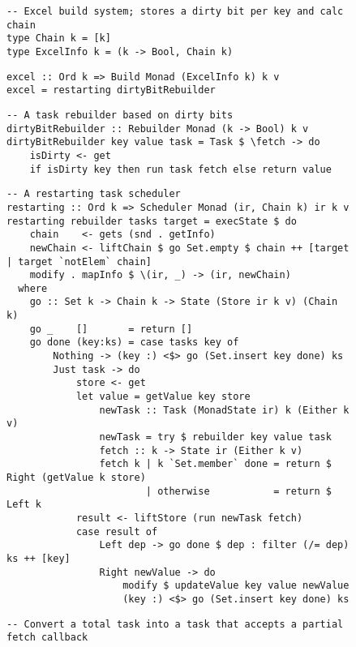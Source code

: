 \begin{figure}
\begin{verbatim}
-- Excel build system; stores a dirty bit per key and calc chain
type Chain k = [k]
type ExcelInfo k = (k -> Bool, Chain k)
\end{verbatim}
\vspace{0mm}
\begin{verbatim}
excel :: Ord k => Build Monad (ExcelInfo k) k v
excel = restarting dirtyBitRebuilder
\end{verbatim}
\vspace{0mm}
\begin{verbatim}
-- A task rebuilder based on dirty bits
dirtyBitRebuilder :: Rebuilder Monad (k -> Bool) k v
dirtyBitRebuilder key value task = Task $ \fetch -> do
    isDirty <- get
    if isDirty key then run task fetch else return value
\end{verbatim}
\vspace{0mm}
\begin{verbatim}
-- A restarting task scheduler
restarting :: Ord k => Scheduler Monad (ir, Chain k) ir k v
restarting rebuilder tasks target = execState $ do
    chain    <- gets (snd . getInfo)
    newChain <- liftChain $ go Set.empty $ chain ++ [target | target `notElem` chain]
    modify . mapInfo $ \(ir, _) -> (ir, newChain)
  where
    go :: Set k -> Chain k -> State (Store ir k v) (Chain k)
    go _    []       = return []
    go done (key:ks) = case tasks key of
        Nothing -> (key :) <$> go (Set.insert key done) ks
        Just task -> do
            store <- get
            let value = getValue key store
                newTask :: Task (MonadState ir) k (Either k v)
                newTask = try $ rebuilder key value task
                fetch :: k -> State ir (Either k v)
                fetch k | k `Set.member` done = return $ Right (getValue k store)
                        | otherwise           = return $ Left k
            result <- liftStore (run newTask fetch)
            case result of
                Left dep -> go done $ dep : filter (/= dep) ks ++ [key]
                Right newValue -> do
                    modify $ updateValue key value newValue
                    (key :) <$> go (Set.insert key done) ks
\end{verbatim}
\vspace{0mm}
\begin{verbatim}
-- Convert a total task into a task that accepts a partial fetch callback

\end{verbatim}
\end{figure}
